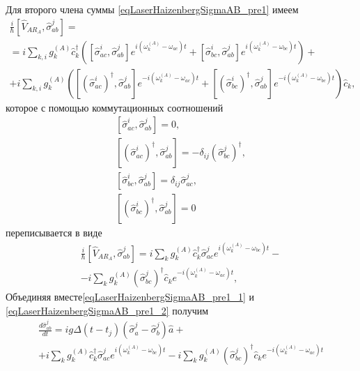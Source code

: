 Для второго члена суммы \eqref{eqLaserHaizenbergSigmaAB_pre1} имеем
\begin{eqnarray}
\frac{i}{\hbar}
\left[\hat{V}_{AR_A}, \hat{\sigma}_{ab}^j\right] = 
\nonumber \\
=
i
\sum_{k,i}
g_k^{(A)}
\hat{c}_k^{\dag}
 \left(
\left[\hat{\sigma}^{i}_{ac},\hat{\sigma}_{ab}^j\right]  
e^{i\left(\omega_k^{(A)} - \omega_{ac}\right)t}
+ 
\left[\hat{\sigma}^{i}_{bc},\hat{\sigma}_{ab}^j\right]  
e^{i\left(\omega_k^{(A)} - \omega_{bc}\right)t}
\right)
+
\nonumber \\
+
 i
\sum_{k,i}
g_k^{(A)}
 \left(
\left[\left(\hat{\sigma}^{i}_{ac}\right)^{\dag},\hat{\sigma}_{ab}^j\right]  
e^{-i\left(\omega_k^{(A)} - \omega_{ac}\right)t}
+ 
\left[\left(\hat{\sigma}^{i}_{bc}\right)^{\dag},\hat{\sigma}_{ab}^j\right]  
e^{-i\left(\omega_k^{(A)} - \omega_{bc}\right)t}
\right)\hat{c}_k,
\nonumber
\end{eqnarray}
которое с помощью коммутационных соотношений
\begin{eqnarray}
\left[\hat{\sigma}^{i}_{ac},\hat{\sigma}_{ab}^j\right] = 0, 
\nonumber \\
\left[\left(\hat{\sigma}^{i}_{ac}\right)^{\dag},\hat{\sigma}_{ab}^j\right] = 
- \delta_{ij}\left(\hat{\sigma}^{j}_{bc}\right)^{\dag},
\nonumber \\
\left[\hat{\sigma}^{i}_{bc},\hat{\sigma}_{ab}^j\right] = \delta_{ij}\hat{\sigma}^{j}_{ac},
\nonumber \\
\left[\left(\hat{\sigma}^{i}_{bc}\right)^{\dag},\hat{\sigma}_{ab}^j\right] = 0
\label{eqLaserHaizenbergTaskKommutator2}
\end{eqnarray}
переписывается в виде
\begin{eqnarray}
\frac{i}{\hbar}
\left[\hat{V}_{AR_A}, \hat{\sigma}_{ab}^j\right] = 
i
\sum_{k}
g_k^{(A)}
\hat{c}_k^{\dag}
\hat{\sigma}^{j}_{ac}  
e^{i\left(\omega_k^{(A)} - \omega_{bc}\right)t} -
\nonumber \\
-
 i
\sum_{k}
g_k^{(A)}
\left(\hat{\sigma}^{j}_{bc}\right)^{\dag}\hat{c}_k
e^{-i\left(\omega_k^{(A)} - \omega_{ac}\right)t},
\label{eqLaserHaizenbergSigmaAB_pre1_2}
\end{eqnarray}
Объединяя вместе\eqref{eqLaserHaizenbergSigmaAB_pre1_1} и 
\eqref{eqLaserHaizenbergSigmaAB_pre1_2} получим 
\begin{eqnarray}
\frac{d \hat{\sigma}_{ab}^j}{d t} = 
i g 
\Delta\left(t - t_j\right) 
\left(\hat{\sigma}^{j}_{a} -
\hat{\sigma}^{j}_{b}\right)\hat{a} +
\nonumber \\
+ i \sum_{k}
g_k^{(A)}
\hat{c}_k^{\dag}
\hat{\sigma}^{j}_{ac}  
e^{i\left(\omega_k^{(A)} - \omega_{bc}\right)t}
-
 i
\sum_{k}
g_k^{(A)}
\left(\hat{\sigma}^{j}_{bc}\right)^{\dag}\hat{c}_k
e^{-i\left(\omega_k^{(A)} - \omega_{ac}\right)t}
\label{eqLaserHaizenbergSigmaAB_pre2}
\end{eqnarray}
